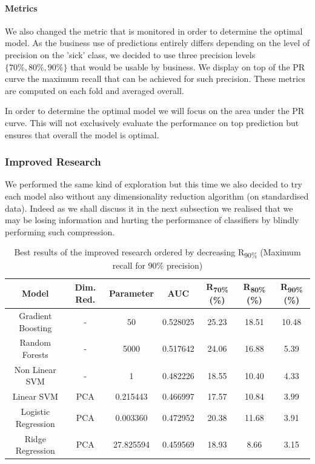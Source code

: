 \paragraph{Metrics}
We also changed the metric that is monitored in order to determine the optimal model. As the business use of predictions entirely differs depending on the level of precision on the 'sick' class, we decided to use three precision levels $\{70\%,80\%,90\%\}$ that would be usable by business. We display on top of the PR curve the maximum recall that can be achieved for such precision. These metrics are computed on each fold and averaged overall. 

In order to determine the optimal model we will focus on the area under the PR curve. This will not exclusively evaluate the performance on top prediction but ensures that overall the model is optimal.

\subsubsection{Improved Research}
We performed the same kind of exploration but this time we also decided to try each model also without any dimensionality reduction algorithm (on standardised data). Indeed as we shall discuss it in the next subsection we realised that we may be losing information and hurting the performance of classifiers by blindly performing such compression.

\begin{table}[h]
\begin{center}
\begin{tabular}{c c c c c c c}
\hline
\textbf{Model} & \textbf{Dim. Red.} & \textbf{Parameter} & \textbf{AUC}& \textbf{R\textsubscript{70\%}(\%)} & \textbf{R\textsubscript{80\%}(\%)} & \textbf{R\textsubscript{90\%}(\%)} \\ 
\hline\hline
Gradient Boosting 	& - 		& 50 		& 0.528025 & 25.23 	& 18.51 & 10.48 \\
Random Forests 		& - 		& 5000		& 0.517642 & 24.06 	& 16.88 & 5.39\\
Non Linear SVM  	& - 		& 1	 		& 0.482226 & 18.55 	& 10.40 & 4.33\\
Linear SVM 			& PCA 	& 0.215443 	& 0.466997 & 17.57 	& 10.84 & 3.99\\
Logistic Regression & PCA 	& 0.003360 	& 0.472952 & 20.38 	& 11.68 & 3.91\\
Ridge Regression 	& PCA 	& 27.825594 	& 0.459569 & 18.93 	& 8.66 	& 3.15\\
\end{tabular}
\end{center}
\caption{\label{improved_results} Best results of the improved research ordered by decreasing R\textsubscript{90\%} (Maximum recall for 90\% precision)}
\end{table}

